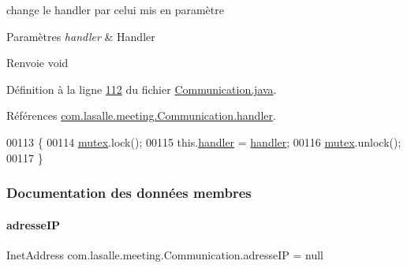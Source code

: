 change le handler par celui mis en paramètre 


\begin{DoxyParams}{Paramètres}
{\em handler} & Handler \\
\hline
\end{DoxyParams}
\begin{DoxyReturn}{Renvoie}
void 
\end{DoxyReturn}


Définition à la ligne \hyperlink{_communication_8java_source_l00112}{112} du fichier \hyperlink{_communication_8java_source}{Communication.\+java}.



Références \hyperlink{_communication_8java_source_l00039}{com.\+lasalle.\+meeting.\+Communication.\+handler}.


\begin{DoxyCode}
00113     \{
00114         \hyperlink{classcom_1_1lasalle_1_1meeting_1_1_communication_af123afba8dcddc259017fb5c3b431dab}{mutex}.lock();
00115         this.\hyperlink{classcom_1_1lasalle_1_1meeting_1_1_communication_a05fa5f360f28819a9e106e0265a74643}{handler} = \hyperlink{classcom_1_1lasalle_1_1meeting_1_1_communication_a05fa5f360f28819a9e106e0265a74643}{handler};
00116         \hyperlink{classcom_1_1lasalle_1_1meeting_1_1_communication_af123afba8dcddc259017fb5c3b431dab}{mutex}.unlock();
00117     \}
\end{DoxyCode}


\subsubsection{Documentation des données membres}
\mbox{\label{classcom_1_1lasalle_1_1meeting_1_1_communication_a46e5fbc8ec97ad651d544e09121a6468}} 
\paragraph{\texorpdfstring{adresse\+IP}{adresseIP}}
{\footnotesize\ttfamily Inet\+Address com.\+lasalle.\+meeting.\+Communication.\+adresse\+IP = null\hspace{0.3cm}{\ttfamily [private]}}



